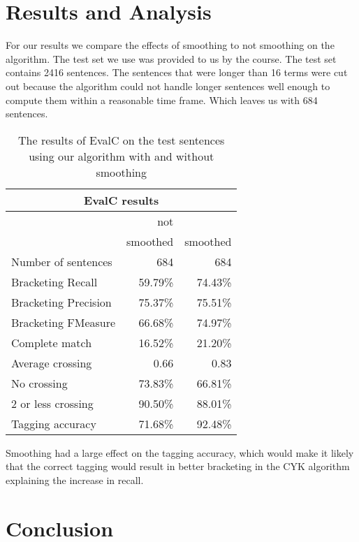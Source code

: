 \documentclass[11pt,twocolumn]{article}
\begin{document}



\section{Results and Analysis}
For our results we compare the effects of smoothing to not smoothing on the algorithm. The test set we use was provided to us by the course. The test set contains 2416 sentences. The sentences that were longer than 16 terms were cut out because the algorithm could not handle longer sentences well enough to compute them within a reasonable time frame. Which leaves us with 684 sentences.

\begin{table}[!htb]
\centering
\begin{tabular}{|l|r|r|}
\hline
\multicolumn{3}{|c|}{EvalC results}\\
\hline
& not  & \\
& smoothed & smoothed  \\
\hline
Number of sentences     & 684 & 684 \\
Bracketing Recall         &  59.79\% & 74.43\% \\
Bracketing Precision      &  75.37\% & 75.51\% \\
Bracketing FMeasure       &  66.68\% & 74.97\% \\
Complete match            &  16.52\% & 21.20\% \\
Average crossing          &   0.66 & 0.83 \\
No crossing               &  73.83\% & 66.81\% \\
2 or less crossing        &  90.50\% & 88.01\% \\
Tagging accuracy          &  71.68\% & 92.48\% \\
\hline
\end{tabular}
\caption{The results of EvalC on the test sentences using our algorithm with and without smoothing}
\label{tab:results}
\end{table}

Smoothing had a large effect on the tagging accuracy, which would make it likely that the correct tagging would result in better bracketing in the CYK algorithm explaining the increase in recall.


\section{Conclusion}
\end{document}
